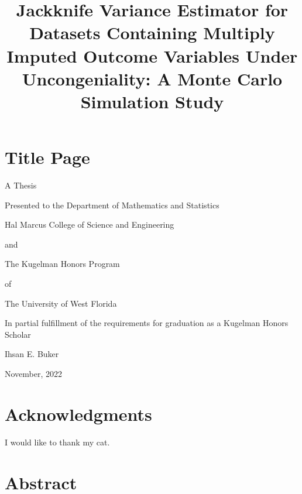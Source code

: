 \documentclass[
  letterpaper,
  DIV=11,
  numbers=noendperiod]{scrreprt}
\title{Jackknife Variance Estimator for Datasets Containing Multiply
Imputed Outcome Variables Under Uncongeniality: A Monte Carlo Simulation
Study}
\author{}
\date{}
\renewcommand*\contentsname{Table of contents}
\newcommand\contentsname{Table of contents}
\begin{document}
\maketitle
\ifdefined\Shaded\renewenvironment{Shaded}{\begin{tcolorbox}[enhanced, frame hidden, interior hidden, borderline west={3pt}{0pt}{shadecolor}, breakable, sharp corners, boxrule=0pt]}{\end{tcolorbox}}\fi

\renewcommand*\contentsname{Table of contents}
{
\hypersetup{linkcolor=}
\setcounter{tocdepth}{2}
\tableofcontents
}

\hypertarget{title-page}{%
\chapter*{\texorpdfstring{{Title Page}}{Title Page}}\label{title-page}}

A Thesis

Presented to the Department of Mathematics and Statistics

Hal Marcus College of Science and Engineering

and

The Kugelman Honors Program

of

The University of West Florida

In partial fulfillment of the requirements for graduation as a Kugelman
Honors Scholar

Ihsan E. Buker

November, 2022


\hypertarget{acknowledgments}{%
\chapter*{Acknowledgments}\label{acknowledgments}}

I would like to thank my cat.


\hypertarget{abstract}{%
\chapter{Abstract}\label{abstract}}
\end{document}
